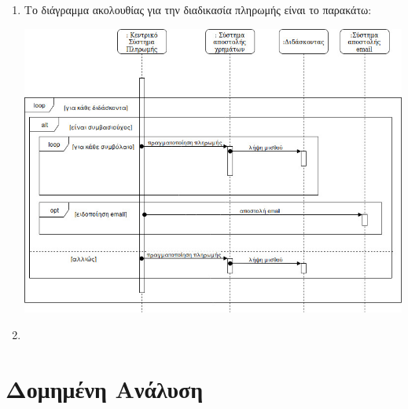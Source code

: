 \documentclass[12pt]{article}
\begin{document}
\begin{enumerate}
\item
Το διάγραμμα ακολουθίας για την διαδικασία πληρωμής είναι το παρακάτω:\\
\begin{center}
\includegraphics[scale=0.5]{sequence}
\end{center}

\item
\end{enumerate}


\section*{Δομημένη Ανάλυση}
\end{document}
